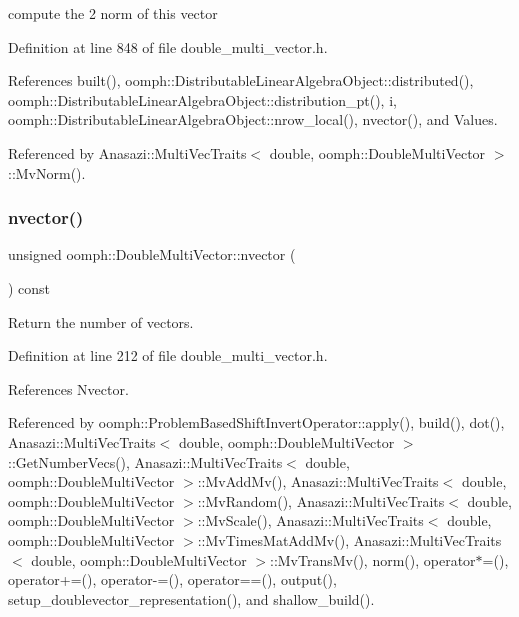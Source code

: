 compute the 2 norm of this vector 



Definition at line 848 of file double\+\_\+multi\+\_\+vector.\+h.



References built(), oomph\+::\+Distributable\+Linear\+Algebra\+Object\+::distributed(), oomph\+::\+Distributable\+Linear\+Algebra\+Object\+::distribution\+\_\+pt(), i, oomph\+::\+Distributable\+Linear\+Algebra\+Object\+::nrow\+\_\+local(), nvector(), and Values.



Referenced by Anasazi\+::\+Multi\+Vec\+Traits$<$ double, oomph\+::\+Double\+Multi\+Vector $>$\+::\+Mv\+Norm().

\mbox{\label{classoomph_1_1DoubleMultiVector_ae5d4d50a01bb6537701921e0d1a1cdff}} 
\subsubsection{\texorpdfstring{nvector()}{nvector()}}
{\footnotesize\ttfamily unsigned oomph\+::\+Double\+Multi\+Vector\+::nvector (\begin{DoxyParamCaption}{ }\end{DoxyParamCaption}) const\hspace{0.3cm}{\ttfamily [inline]}}



Return the number of vectors. 



Definition at line 212 of file double\+\_\+multi\+\_\+vector.\+h.



References Nvector.



Referenced by oomph\+::\+Problem\+Based\+Shift\+Invert\+Operator\+::apply(), build(), dot(), Anasazi\+::\+Multi\+Vec\+Traits$<$ double, oomph\+::\+Double\+Multi\+Vector $>$\+::\+Get\+Number\+Vecs(), Anasazi\+::\+Multi\+Vec\+Traits$<$ double, oomph\+::\+Double\+Multi\+Vector $>$\+::\+Mv\+Add\+Mv(), Anasazi\+::\+Multi\+Vec\+Traits$<$ double, oomph\+::\+Double\+Multi\+Vector $>$\+::\+Mv\+Random(), Anasazi\+::\+Multi\+Vec\+Traits$<$ double, oomph\+::\+Double\+Multi\+Vector $>$\+::\+Mv\+Scale(), Anasazi\+::\+Multi\+Vec\+Traits$<$ double, oomph\+::\+Double\+Multi\+Vector $>$\+::\+Mv\+Times\+Mat\+Add\+Mv(), Anasazi\+::\+Multi\+Vec\+Traits$<$ double, oomph\+::\+Double\+Multi\+Vector $>$\+::\+Mv\+Trans\+Mv(), norm(), operator$\ast$=(), operator+=(), operator-\/=(), operator==(), output(), setup\+\_\+doublevector\+\_\+representation(), and shallow\+\_\+build().

